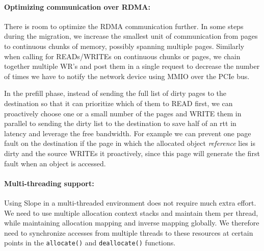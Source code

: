 \paragraph{Optimizing communication over RDMA:} There is room to optimize
the RDMA communication further. In some steps during the migration, we
increase the smallest unit of communication from pages to continuous chunks
of memory, possibly spanning multiple pages. Similarly when calling for
READs/WRITEs on continuous chunks or pages, we chain together multiple
WR's and post them in a single request to decrease the number of times we
have to notify the network device using MMIO over the PCIe bus.

In the prefill phase, instead of sending the full list of dirty pages to the
destination so that it can prioritize which of them to READ first, we can
proactively choose one or a small number of the pages and WRITE them in
parallel to sending the dirty list to the destination to save half of an rtt
in latency and leverage the free bandwidth.
For example we can prevent one page fault on the destination
if the page in which the allocated object \emph{reference} lies is dirty and
the source WRITEs it proactively, since this page will generate the first
fault when an object is accessed.


\paragraph{Multi-threading support:} Using Slope in a multi-threaded
environment does not require much extra effort. We need to use multiple
allocation context stacks and maintain them per thread, while maintaining
allocation mapping and inverse mapping globally. We therefore need to
synchronize accesses from multiple threads to these resources at certain points
in the \texttt{allocate()} and \texttt{deallocate()} functions.
